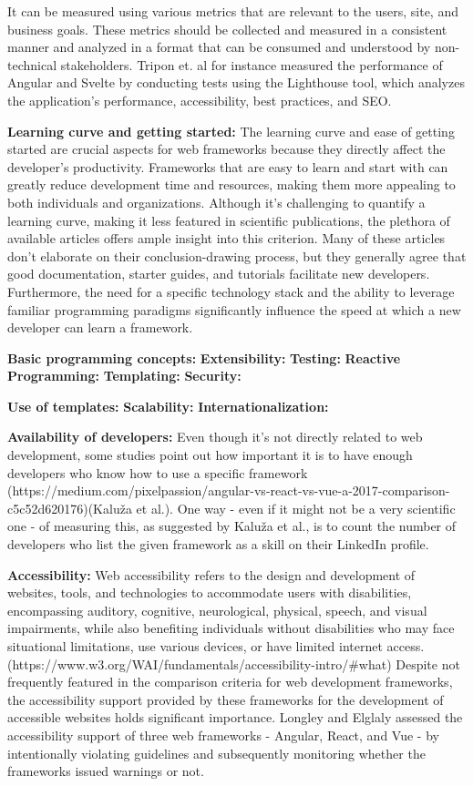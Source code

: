 It can be measured using various metrics that are relevant to the users, site, and business goals. These metrics should be collected and measured in a consistent manner and analyzed in a format that can be consumed and understood by non-technical stakeholders. Tripon et. al for instance measured the performance of Angular and Svelte by conducting tests using the Lighthouse tool, which analyzes the application's performance, accessibility, best practices, and SEO.

\textbf{Learning curve and getting started:}
The learning curve and ease of getting started are crucial aspects for web frameworks because they directly affect the developer's productivity. Frameworks that are easy to learn and start with can greatly reduce development time and resources, making them more appealing to both individuals and organizations. Although it's challenging to quantify a learning curve, making it less featured in scientific publications, the plethora of available articles offers ample insight into this criterion. Many of these articles don't elaborate on their conclusion-drawing process, but they generally agree that good documentation, starter guides, and tutorials facilitate new developers. Furthermore, the need for a specific technology stack and the ability to leverage familiar programming paradigms significantly influence the speed at which a new developer can learn a framework. 

\textbf{Basic programming concepts:}
\textbf{Extensibility:}
\textbf{Testing:}
\textbf{Reactive Programming:}
\textbf{Templating:}
\textbf{Security:}


\textbf{Use of templates:}
\textbf{Scalability:}
\textbf{Internationalization:}

\textbf{Availability of developers:}
Even though it's not directly related to web development, some studies point out how important it is to have enough developers who know how to use a specific framework (https://medium.com/pixelpassion/angular-vs-react-vs-vue-a-2017-comparison-c5c52d620176)(Kaluža et al.). One way - even if it might not be a very scientific one - of measuring this, as suggested by Kaluža et al., is to count the number of developers who list the given framework as a skill on their LinkedIn profile.

\textbf{Accessibility:}
Web accessibility refers to the design and development of websites, tools, and technologies to accommodate users with disabilities, encompassing auditory, cognitive, neurological, physical, speech, and visual impairments, while also benefiting individuals without disabilities who may face situational limitations, use various devices, or have limited internet access.
(https://www.w3.org/WAI/fundamentals/accessibility-intro/#what)
Despite not frequently featured in the comparison criteria for web development frameworks, the accessibility support provided by these frameworks for the development of accessible websites holds significant importance. Longley and Elglaly assessed the accessibility support of three web frameworks - Angular, React, and Vue - by intentionally violating guidelines and subsequently monitoring whether the frameworks issued warnings or not.


